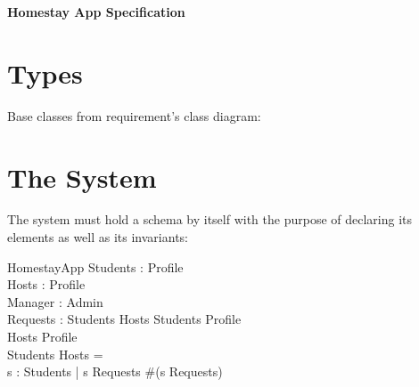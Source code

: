\documentclass[11pt]{article}
\begin{document}
\begin{center}\LARGE
	\textbf{Homestay App Specification}
\end{center}

\section*{Types}
Base classes from requirement's class diagram:
\begin{zed}
\end{zed}

\section*{The System}
The system must hold a schema by itself with the purpose of declaring its elements as well as its invariants:
\begin{schema}{HomestayApp}
	Students : \power Profile\\
	Hosts : \power Profile\\
	Manager : \power Admin\\
	Requests : Students \rightarrow Hosts
\where
	Students \in Profile\\
	Hosts \in Profile\\
	Students \cap Hosts = \emptyset\\
	\forall s : Students | s \in \dom Requests \bullet \#(s \dres Requests) 
\end{schema}
\end{document}
